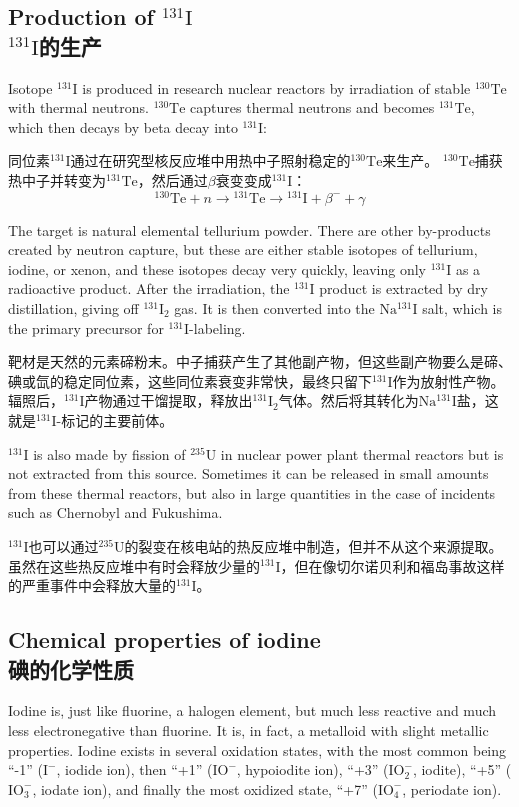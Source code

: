 \documentclass[dvipsnames, svgnames,a4paper,11pt]{article}
\begin{document}
\subsection{Production of \(\mathrm{^{131}I}\)\\ \(\mathrm{^{131}I}\)的生产}  
Isotope \(\mathrm{^{131}I}\) is produced in research nuclear reactors by irradiation of stable \(\mathrm{^{130}Te}\) with thermal neutrons. \(\mathrm{^{130}Te}\) captures thermal neutrons and becomes \(\mathrm{^{131}Te}\), which then decays by beta decay into \(\mathrm{^{131}I}\):

同位素\(\mathrm{^{131}I}\)通过在研究型核反应堆中用热中子照射稳定的\(\mathrm{^{130}Te}\)来生产。 \(\mathrm{^{130}Te}\)捕获热中子并转变为\(\mathrm{^{131}Te}\)，然后通过\(\beta\)衰变变成\(\mathrm{^{131}I}\)：
\[
\mathrm{^{130}Te} + n \rightarrow \mathrm{^{131}Te} \rightarrow \mathrm{^{131}I} + \beta^- + \gamma
\]

The target is natural elemental tellurium powder. There are other by-products created by neutron capture, but these are either stable isotopes of tellurium, iodine, or xenon, and these isotopes decay very quickly, leaving only \(\mathrm{^{131}I}\) as a radioactive product. After the irradiation, the \(\mathrm{^{131}I}\) product is extracted by dry distillation, giving off \(\mathrm{^{131}I_2}\) gas. It is then converted into the \(\mathrm{Na^{131}I}\) salt, which is the primary precursor for \(\mathrm{^{131}I}\)-labeling.

靶材是天然的元素碲粉末。中子捕获产生了其他副产物，但这些副产物要么是碲、碘或氙的稳定同位素，这些同位素衰变非常快，最终只留下\(\mathrm{^{131}I}\)作为放射性产物。辐照后，\(\mathrm{^{131}I}\)产物通过干馏提取，释放出\(\mathrm{^{131}I_2}\)气体。然后将其转化为\(\mathrm{Na^{131}I}\)盐，这就是\(\mathrm{^{131}I}\)-标记的主要前体。

\(\mathrm{^{131}I}\) is also made by fission of \(\mathrm{^{235}U}\) in nuclear power plant thermal reactors but is not extracted from this source. Sometimes it can be released in small amounts from these thermal reactors, but also in large quantities in the case of incidents such as Chernobyl and Fukushima.

\(\mathrm{^{131}I}\)也可以通过\(\mathrm{^{235}U}\)的裂变在核电站的热反应堆中制造，但并不从这个来源提取。虽然在这些热反应堆中有时会释放少量的\(\mathrm{^{131}I}\)，但在像切尔诺贝利和福岛事故这样的严重事件中会释放大量的\(\mathrm{^{131}I}\)。

\subsection{Chemical properties of iodine\\ 碘的化学性质}  
Iodine is, just like fluorine, a halogen element, but much less reactive and much less electronegative than fluorine. It is, in fact, a metalloid with slight metallic properties. Iodine exists in several oxidation states, with the most common being “-1” (\(\mathrm{I^-}\), iodide ion), then “+1” (\(\mathrm{IO^-}\), hypoiodite ion), “+3” (\(\mathrm{IO_2^-}\), iodite), “+5” (\(\mathrm{IO_3^-}\), iodate ion), and finally the most oxidized state, “+7” (\(\mathrm{IO_4^-}\), periodate ion).  
\end{document}

